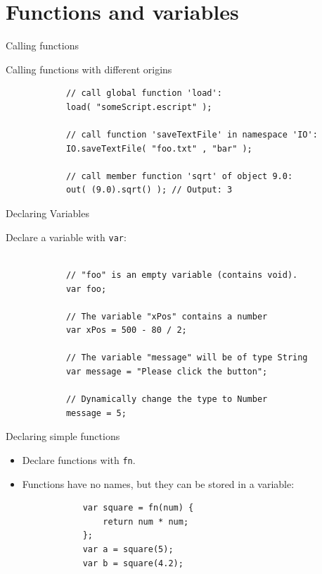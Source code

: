 \documentclass[ucs,9pt]{beamer}
\begin{document}
\section{Functions and variables}
\begin{frame}[fragile]{Calling functions}
	\begin{block}{Calling functions with different origins}
		\begin{lstlisting}
			// call global function 'load':
			load( "someScript.escript" );  
			
			// call function 'saveTextFile' in namespace 'IO':
			IO.saveTextFile( "foo.txt" , "bar" ); 
			
			// call member function 'sqrt' of object 9.0:
			out( (9.0).sqrt() ); // Output: 3
		\end{lstlisting}
	\end{block}
\end{frame}

	
\begin{frame}[fragile]{Declaring Variables}
	\begin{block}{Declare a variable with \lstinline!var!:}
		\begin{lstlisting}
			
			// "foo" is an empty variable (contains void).
			var foo; 
			
			// The variable "xPos" contains a number
			var xPos = 500 - 80 / 2;

			// The variable "message" will be of type String
			var message = "Please click the button";

			// Dynamically change the type to Number
			message = 5;
		\end{lstlisting}
	\end{block}
\end{frame}

\begin{frame}[fragile]{Declaring simple functions}
	\begin{itemize}
	\item Declare functions with \lstinline!fn!.
	\item Functions have no names, but they can be stored in a variable:
		\begin{lstlisting}
			var square = fn(num) {
			    return num * num;
			};
			var a = square(5);
			var b = square(4.2);
		\end{lstlisting}
		\end{itemize}
	\end{frame}
\end{document}
